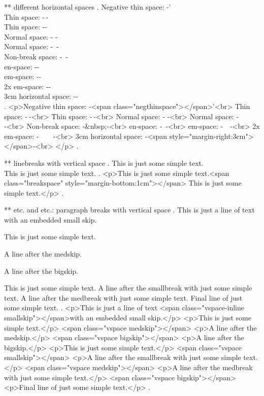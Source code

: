 ** different horizontal spaces
.
Negative thin space: -\negthinspace' \\
Thin space: -\,- \\
Thin space: -\thinspace- \\
Normal space: - - \\
Normal space: -\ - \\
Non-break space: -~- \\
en-space: -\enspace- \\
em-space: -\quad- \\
2x em-space: -\qquad-\\
3cm horizontal space: -\hspace{3cm}- \\
.
<p>Negative thin space: ‐<span class="negthinspace"></span>'<br>
Thin space: ‐ ‐<br>
Thin space: ‐ ‐<br>
Normal space: ‐ ‐<br>
Normal space: ‐​ ‐<br>
Non‐break space: ‐&nbsp;‐<br>
en‐space: ‐ ‐<br>
em‐space: ‐ ‐<br>
2x em‐space: ‐  ‐<br>
3cm horizontal space: ‐<span style="margin-right:3cm"></span>‐<br>
</p>
.


** linebreaks with vertical space
.
This is just some simple text.\\[1cm]
This is just some simple text.
.
<p>This is just some simple text.<span class="breakspace" style="margin-bottom:1cm"></span>
This is just some simple text.</p>
.


** \smallskip etc. and \smallbreak etc.: paragraph breaks with vertical space
.
This is just a line of text \smallskip with an embedded small skip.

This is just some simple text.

\medskip
A line after the medskip.

\bigskip

A line after the bigskip.

This is just some simple text.
\smallbreak
A line after the smallbreak with just some simple text.
\medbreak
A line after the medbreak with just some simple text.
\bigbreak
Final line of just some simple text.
.
<p>This is just a line of text <span class="vspace-inline smallskip"></span>with an embedded small skip.</p>
<p>This is just some simple text.</p>
<span class="vspace medskip"></span>
<p>A line after the medskip.</p>
<span class="vspace bigskip"></span>
<p>A line after the bigskip.</p>
<p>This is just some simple text.</p>
<span class="vspace smallskip"></span>
<p>A line after the smallbreak with just some simple text.</p>
<span class="vspace medskip"></span>
<p>A line after the medbreak with just some simple text.</p>
<span class="vspace bigskip"></span>
<p>Final line of just some simple text.</p>
.


